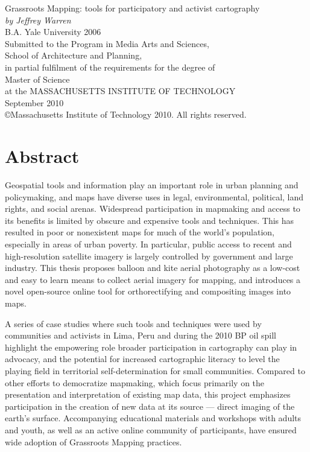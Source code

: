 \documentclass[11pt,oneside,notitlepage]{report}
\begin{document}
\setlength{\parindent}{0pt}
\setlength{\parskip}{0.8em}

\pagebreak
\Large{Grassroots Mapping: tools for participatory and activist cartography \vspace{10px} \\ 
\emph{by Jeffrey Warren}\vspace{10px} \\ 
B.A. Yale University 2006} \vspace{20px} \\ 
\large{Submitted to the Program in Media Arts and Sciences,\\
School of Architecture and Planning,\\
in partial fulfilment of the requirements for the degree of\\
Master of Science\\
at the {\sc MASSACHUSETTS INSTITUTE OF TECHNOLOGY}\\
September 2010\\ 
\copyright Massachusetts Institute of Technology 2010. All rights reserved.}\\ \vspace{20px}

\normalsize{
\section*{Abstract}
Geospatial tools and information play an important role in urban planning and policymaking, and maps have diverse uses in legal, environmental, political, land rights, and social arenas. Widespread participation in mapmaking and access to its benefits is limited by obscure and expensive tools and techniques. This has resulted in poor or nonexistent maps for much of the world's population, especially in areas of urban poverty. In particular, public access to recent and high-resolution satellite imagery is largely controlled by government and large industry. This thesis proposes balloon and kite aerial photography as a low-cost and easy to learn means to collect aerial imagery for mapping, and introduces a novel open-source online tool for orthorectifying and compositing images into maps. 

A series of case studies where such tools and techniques were used by communities and activists in Lima, Peru and during the 2010 BP oil spill highlight the empowering role broader participation in cartography can play in advocacy, and the potential for increased cartographic literacy to level the playing field in territorial self-determination for small communities. Compared to other efforts to democratize mapmaking, which focus primarily on the presentation and interpretation of existing map data, this project emphasizes participation in the creation of new data at its source --- direct imaging of the earth's surface. Accompanying educational materials and workshops with adults and youth, as well as an active online community of participants, have ensured wide adoption of Grassroots Mapping practices.
}
\end{document}
